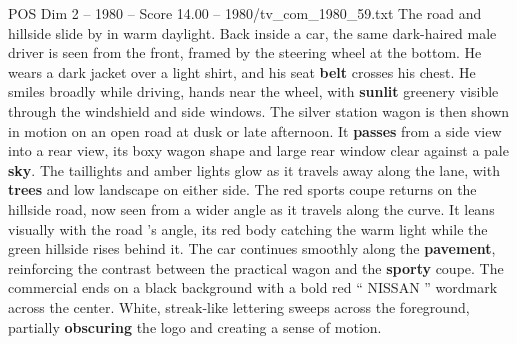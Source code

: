 \begin{textsample}{POS Dim 2 – 1980 – Score 14.00 – 1980/tv\_com\_1980\_59.txt}
The road and hillside slide by in warm daylight.
Back inside a car, the same dark-haired male driver is seen from the front, framed by the steering wheel at the bottom.
He wears a dark jacket over a light shirt, and his seat \textbf{belt} crosses his chest.
He smiles broadly while driving, hands near the wheel, with \textbf{sunlit} greenery visible through the windshield and side windows.
The silver station wagon is then shown in motion on an open road at dusk or late afternoon.
It \textbf{passes} from a side view into a rear view, its boxy wagon shape and large rear window clear against a pale \textbf{sky}.
The taillights and amber lights glow as it travels away along the lane, with \textbf{trees} and low landscape on either side.
The red sports coupe returns on the hillside road, now seen from a wider angle as it travels along the curve.
It leans visually with the road ’s angle, its red body catching the warm light while the green hillside rises behind it.
The car continues smoothly along the \textbf{pavement}, reinforcing the contrast between the practical wagon and the \textbf{sporty} coupe.
The commercial ends on a black background with a bold red “ NISSAN ” wordmark across the center.
White, streak-like lettering sweeps across the foreground, partially \textbf{obscuring} the logo and creating a sense of motion.

\end{textsample}
